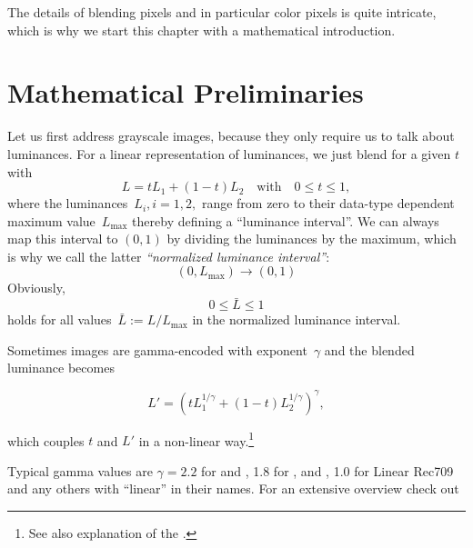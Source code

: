 The details of blending pixels and in particular color pixels is quite
intricate, which is why we start this chapter with a mathematical
introduction.


\section[Mathematical Preliminaries]{Mathematical Preliminaries
  \label{sec:mathematical-preliminaries}
  \label{color profiles!math}}

Let us first address grayscale images, because they only require us to
talk about luminances.  For a linear representation of luminances, we
just blend for a given $t$ with
\begin{equation}\label{equ:trivial-luminance-blend}
  L = t L_1 + (1 - t) L_2 \quad \mbox{with} \quad 0 \leq t \leq 1,
\end{equation}
where the luminances~$L_i, i = 1, 2,$ range from zero to their
data-type dependent maximum value~$L_{\mathrm{max}}$ thereby defining
a ``luminance interval''. We can always map
this interval to $(0, 1)$ by dividing the luminances by the maximum,
which is why we call the latter \emph{``normalized luminance
  interval''}:
\begin{equation}\label{equ:luminance-normalization}
  (0, L_{\mathrm{max}}) \rightarrow (0, 1)
\end{equation}
Obviously,
\begin{equation}\label{equ:normalized-luminance}
  0 \leq \bar{L} \leq 1
\end{equation}
holds for all values~$\bar{L} := L / L_{\mathrm{max}}$ in the
normalized luminance interval.

Sometimes images are gamma-encoded with exponent~$\gamma$ and the blended
luminance becomes

\begin{equation}\label{equ:gamma-luminance-blend}
L' = \left(t L_1^{1/\gamma} + (1 - t) L_2^{1/\gamma}\right)^\gamma,
\end{equation}

which couples $t$ and $L'$ in a non-linear way.\footnote{See also
   explanation of the
  .}

\begin{geeknote}
  Typical gamma values are $\gamma = 2.2$ for  and
  , 1.8 for , and
  , 1.0 for Linear Rec709  and any
  others with ``linear'' in their names.  For an extensive overview
  check out 
\end{geeknote}

